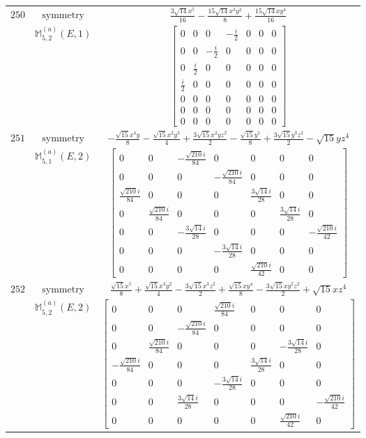 \documentclass[fleqn,8pt,landscape]{jsarticle}
\begin{document}
\begin{longtable}{ccc}
$ 250 $ & $ \text{symmetry} $ & $ \frac{3 \sqrt{14} x^{5}}{16} - \frac{15 \sqrt{14} x^{3} y^{2}}{8} + \frac{15 \sqrt{14} x y^{4}}{16} $ \\
$  $ & $ \mathbb{M}_{5,2}^{(a)}(E,1) $ & $ \begin{bmatrix} 0 & 0 & 0 & - \frac{i}{2} & 0 & 0 & 0 \\ 0 & 0 & - \frac{i}{2} & 0 & 0 & 0 & 0 \\ 0 & \frac{i}{2} & 0 & 0 & 0 & 0 & 0 \\ \frac{i}{2} & 0 & 0 & 0 & 0 & 0 & 0 \\ 0 & 0 & 0 & 0 & 0 & 0 & 0 \\ 0 & 0 & 0 & 0 & 0 & 0 & 0 \\ 0 & 0 & 0 & 0 & 0 & 0 & 0 \end{bmatrix} $ \\ \hline
$ 251 $ & $ \text{symmetry} $ & $ - \frac{\sqrt{15} x^{4} y}{8} - \frac{\sqrt{15} x^{2} y^{3}}{4} + \frac{3 \sqrt{15} x^{2} y z^{2}}{2} - \frac{\sqrt{15} y^{5}}{8} + \frac{3 \sqrt{15} y^{3} z^{2}}{2} - \sqrt{15} y z^{4} $ \\
$  $ & $ \mathbb{M}_{5,1}^{(a)}(E,2) $ & $ \begin{bmatrix} 0 & 0 & - \frac{\sqrt{210} i}{84} & 0 & 0 & 0 & 0 \\ 0 & 0 & 0 & - \frac{\sqrt{210} i}{84} & 0 & 0 & 0 \\ \frac{\sqrt{210} i}{84} & 0 & 0 & 0 & \frac{3 \sqrt{14} i}{28} & 0 & 0 \\ 0 & \frac{\sqrt{210} i}{84} & 0 & 0 & 0 & \frac{3 \sqrt{14} i}{28} & 0 \\ 0 & 0 & - \frac{3 \sqrt{14} i}{28} & 0 & 0 & 0 & - \frac{\sqrt{210} i}{42} \\ 0 & 0 & 0 & - \frac{3 \sqrt{14} i}{28} & 0 & 0 & 0 \\ 0 & 0 & 0 & 0 & \frac{\sqrt{210} i}{42} & 0 & 0 \end{bmatrix} $ \\ \hline
$ 252 $ & $ \text{symmetry} $ & $ \frac{\sqrt{15} x^{5}}{8} + \frac{\sqrt{15} x^{3} y^{2}}{4} - \frac{3 \sqrt{15} x^{3} z^{2}}{2} + \frac{\sqrt{15} x y^{4}}{8} - \frac{3 \sqrt{15} x y^{2} z^{2}}{2} + \sqrt{15} x z^{4} $ \\
$  $ & $ \mathbb{M}_{5,2}^{(a)}(E,2) $ & $ \begin{bmatrix} 0 & 0 & 0 & \frac{\sqrt{210} i}{84} & 0 & 0 & 0 \\ 0 & 0 & - \frac{\sqrt{210} i}{84} & 0 & 0 & 0 & 0 \\ 0 & \frac{\sqrt{210} i}{84} & 0 & 0 & 0 & - \frac{3 \sqrt{14} i}{28} & 0 \\ - \frac{\sqrt{210} i}{84} & 0 & 0 & 0 & \frac{3 \sqrt{14} i}{28} & 0 & 0 \\ 0 & 0 & 0 & - \frac{3 \sqrt{14} i}{28} & 0 & 0 & 0 \\ 0 & 0 & \frac{3 \sqrt{14} i}{28} & 0 & 0 & 0 & - \frac{\sqrt{210} i}{42} \\ 0 & 0 & 0 & 0 & 0 & \frac{\sqrt{210} i}{42} & 0 \end{bmatrix} $ \\ \hline

\end{longtable}
\end{document}
